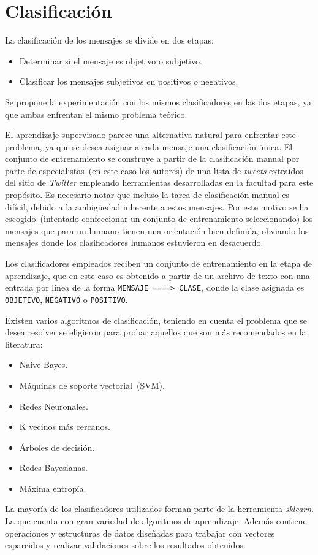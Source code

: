 \chapter{Clasificación}
\label{chap:clas}

	La clasificación de los mensajes se divide en dos etapas:
	
	\begin{itemize}
	\item Determinar si el mensaje es objetivo o subjetivo.
	\item Clasificar los mensajes subjetivos en positivos o negativos.
	\end{itemize}
	
	Se propone la experimentación con los mismos clasificadores en las dos
	etapas, ya que ambas enfrentan el mismo problema teórico.

	El aprendizaje supervisado parece una alternativa natural para enfrentar este
	problema, ya que se desea asignar a cada mensaje una clasificación única.
	El conjunto de entrenamiento se construye a partir de la clasificación
	manual por parte de especialistas~(en este caso los autores) de una lista
	de \emph{tweets} extraídos del sitio de \emph{Twitter} empleando herramientas
	desarrolladas en la facultad para este propósito. Es necesario notar que 
	incluso la tarea de clasificación manual es difícil, debido a la ambigüedad
	inherente a estos mensajes. Por este motivo se ha escogido~(intentado confeccionar
	un conjunto de entrenamiento seleccionando) los mensajes que para un humano
	tienen una orientación bien definida, obviando los mensajes donde los clasificadores
	humanos estuvieron en desacuerdo.
	
	Los clasificadores empleados reciben un conjunto de entrenamiento en 
	la etapa de aprendizaje, que en este caso es obtenido a partir de un archivo de
	texto con una entrada por línea de la forma
	\verb|MENSAJE ====> CLASE|, donde la clase asignada es \verb|OBJETIVO|,
	\verb|NEGATIVO| o \verb|POSITIVO|.
	
	Existen varios algoritmos de clasificación, teniendo en cuenta el problema que se desea 
	resolver se eligieron para probar aquellos que son más recomendados en la literatura:
	\begin{itemize}
	    \item Naive Bayes.
	    \item Máquinas de soporte vectorial~(SVM).
	    \item Redes Neuronales.
	    \item K vecinos más cercanos.
	    \item Árboles de decisión.
	    \item Redes Bayesianas.
	    \item Máxima entropía.
	\end{itemize}
  
	La mayoría de los clasificadores utilizados forman parte de la herramienta \emph{sklearn}.
	La que cuenta con gran variedad de algoritmos de aprendizaje. Además contiene operaciones y estructuras
	de datos diseñadas para trabajar con vectores esparcidos y realizar validaciones sobre los resultados
	obtenidos. 
	

